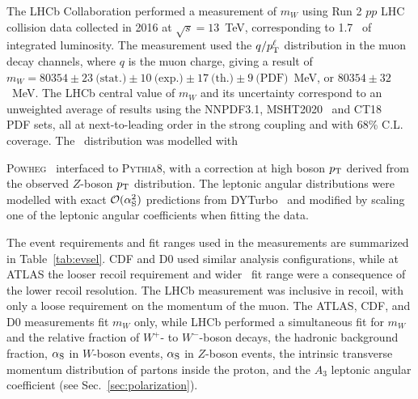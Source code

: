 The LHCb Collaboration performed a measurement of $m_W$ using Run 2 $pp$ LHC collision data collected in 2016 at 
$\sqrt{s}=13$~TeV, corresponding to 1.7~\ifb{} of integrated luminosity.  The measurement used the
$q/p^{\ell}_{\scriptsize\textrm{T}}$ distribution in the muon decay channels, where $q$ is the muon charge, giving a result
of $m_W = 80354 \pm 23~\textrm{(stat.)} \pm 10~\textrm{(exp.)} \pm 17~\textrm{(th.)}\pm 9~\textrm{(PDF)}$~MeV, or
$80354\pm32$~MeV.  The LHCb central value of $m_W$ and its uncertainty correspond to an unweighted average of results
using the
NNPDF3.1, MSHT2020~\cite{Bailey:2020ooq} and CT18~\cite{Hou:2019qau} PDF sets, all at next-to-leading order in the strong
coupling and with 68\% C.L. coverage.  The \pTW~distribution was modelled with
{\textsc{Powheg}~\cite{Nason:2004rx,Frixione:2007vw,Alioli:2010xd} interfaced to {\textsc{Pythia8}}, with a correction
at high boson $p_{\scriptsize\textrm{T}}$ derived from the observed $Z$-boson $p_{\scriptsize\textrm{T}}$ distribution.
The leptonic angular distributions were modelled with exact
$\mathcal{O}(\alpha_{\scriptsize\textrm{S}}^2)$ predictions from DYTurbo~\cite{Camarda:2019zyx}
and modified by scaling one of the leptonic angular coefficients when fitting the data.

The event requirements and fit ranges used in the measurements are summarized in Table~\ref{tab:evsel}.
CDF and D0 used similar analysis configurations, while at
ATLAS the looser recoil requirement and wider \mT~fit range were a consequence of the lower recoil resolution.
The LHCb measurement was inclusive in recoil, with only a loose requirement on the momentum of the muon.
The ATLAS, CDF, and D0 measurements fit $m_W$ only, while LHCb performed a simultaneous fit for $m_W$ and the
relative fraction of $W^+$- to $W^-$-boson decays, the hadronic background fraction, $\alpha_{\scriptsize\textrm{S}}$
in $W$-boson events, $\alpha_{\scriptsize\textrm{S}}$ in $Z$-boson events, the intrinsic transverse momentum 
distribution of partons inside the proton, and the $A_3$ leptonic angular coefficient (see Sec.~\ref{sec:polarization}).

}
